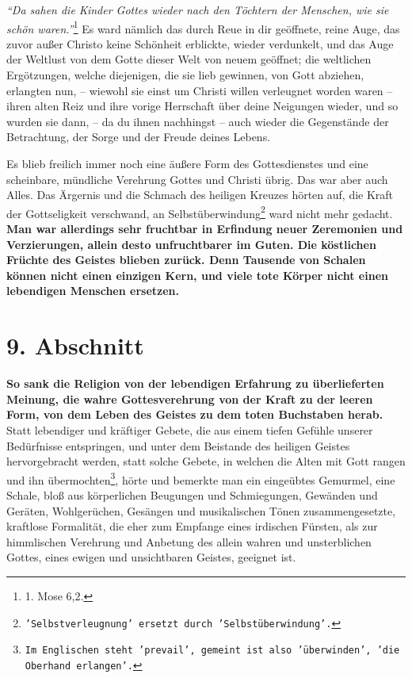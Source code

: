 \textit{"`Da sahen die Kinder Gottes wieder nach den Töchtern der
Menschen, wie sie schön waren."'}\footnote{1. Mose 6,2.}
Es ward nämlich das durch
Reue in dir geöffnete, reine Auge, das zuvor außer Christo keine Schönheit
erblickte, wieder verdunkelt, und das Auge der Weltlust von dem Gotte dieser
Welt von neuem geöffnet; die weltlichen Ergötzungen, welche diejenigen, die sie
lieb gewinnen, von Gott abziehen, erlangten nun, -- wiewohl sie einst um Christi
willen verleugnet worden waren -- ihren alten Reiz und ihre vorige Herrschaft
über deine Neigungen wieder, und so wurden sie dann, -- da du ihnen nachhingst
-- auch wieder die Gegenstände der Betrachtung, der Sorge und der Freude deines
Lebens.

\medskip

Es blieb freilich immer noch eine äußere Form des Gottesdienstes und eine
scheinbare, mündliche Verehrung Gottes und Christi übrig. Das war aber auch
Alles. Das Ärgernis und die Schmach des heiligen Kreuzes hörten auf, die Kraft
der Gottseligkeit verschwand, an
Selbstüberwindung\footnote{\texttt{'Selbstverleugnung' ersetzt durch
'Selbstüberwindung'.}}
ward nicht mehr gedacht. \textbf{Man
war allerdings sehr fruchtbar in Erfindung neuer Zeremonien und Verzierungen,
allein desto unfruchtbarer im Guten. Die köstlichen Früchte des Geistes blieben
zurück. Denn Tausende von Schalen können nicht einen einzigen Kern, und viele
tote Körper nicht einen lebendigen Menschen ersetzen.}

\section{9. Abschnitt}  \label{kap2_ab9}

\label{ref:02_09_lebendige_erfahrung} \textbf{So sank die Religion von der
lebendigen Erfahrung zu überlieferten Meinung,
die wahre Gottesverehrung von der Kraft zu der leeren Form, von dem Leben des
Geistes zu dem toten Buchstaben herab.} Statt lebendiger und kräftiger Gebete,
die aus einem tiefen Gefühle unserer Bedürfnisse entspringen, und unter dem
Beistande des heiligen Geistes hervorgebracht werden, statt solche Gebete,
in welchen die Alten mit Gott rangen und ihn übermochten\footnote{\texttt{Im
Englischen steht 'prevail', gemeint ist also 'überwinden', 'die Oberhand
erlangen'.}},
hörte und bemerkte man ein
eingeübtes Gemurmel, eine Schale, bloß aus körperlichen Beugungen und
Schmiegungen, Gewänden und Geräten, Wohlgerüchen, Gesängen und musikalischen
Tönen zusammengesetzte, kraftlose Formalität, die eher zum Empfange eines
irdischen Fürsten, als zur himmlischen Verehrung und Anbetung des allein wahren
und unsterblichen Gottes, eines ewigen und unsichtbaren Geistes, geeignet ist.

